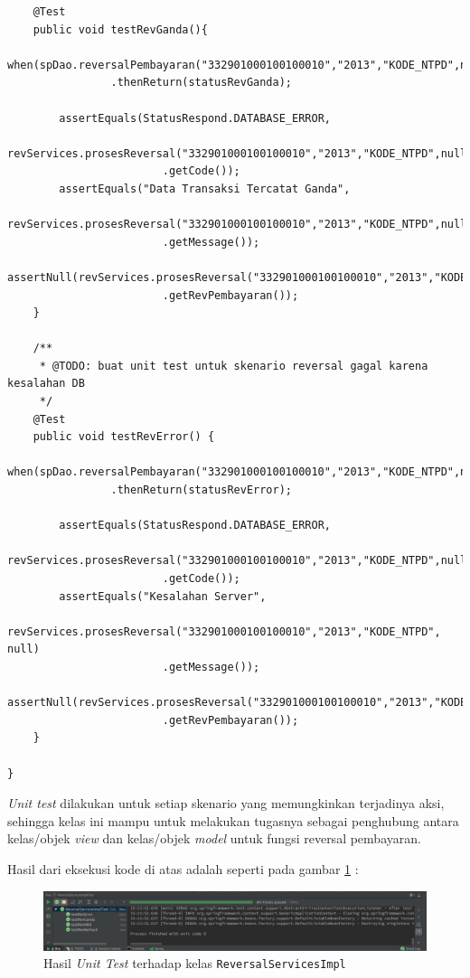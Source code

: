 \documentclass[pdftex,12pt, oneside]{article}
\begin{document}
\begin{enumerate}[A.]
\begin{enumerate}[1.]
\begin{lstlisting}
    @Test
    public void testRevGanda(){
        when(spDao.reversalPembayaran("332901000100100010","2013","KODE_NTPD",null))
                .thenReturn(statusRevGanda);

        assertEquals(StatusRespond.DATABASE_ERROR,
                revServices.prosesReversal("332901000100100010","2013","KODE_NTPD",null)
                        .getCode());
        assertEquals("Data Transaksi Tercatat Ganda",
                revServices.prosesReversal("332901000100100010","2013","KODE_NTPD",null)
                        .getMessage());
        assertNull(revServices.prosesReversal("332901000100100010","2013","KODE_NTPD",null)
                        .getRevPembayaran());
    }

    /**
     * @TODO: buat unit test untuk skenario reversal gagal karena kesalahan DB
     */
    @Test
    public void testRevError() {
        when(spDao.reversalPembayaran("332901000100100010","2013","KODE_NTPD",null))
                .thenReturn(statusRevError);

        assertEquals(StatusRespond.DATABASE_ERROR,
                revServices.prosesReversal("332901000100100010","2013","KODE_NTPD",null)
                        .getCode());
        assertEquals("Kesalahan Server",
                revServices.prosesReversal("332901000100100010","2013","KODE_NTPD", null)
                        .getMessage());
        assertNull(revServices.prosesReversal("332901000100100010","2013","KODE_NTPD",null)
                        .getRevPembayaran());
    }

}   
    \end{lstlisting}
    
    \textit{Unit test} dilakukan untuk setiap skenario yang memungkinkan terjadinya aksi, sehingga kelas ini mampu untuk melakukan tugasnya sebagai penghubung antara kelas/objek \textit{view} dan kelas/objek \textit{model} untuk fungsi reversal pembayaran.
    
    Hasil dari eksekusi kode di atas adalah seperti pada gambar \ref{fig:rev-service-ut} :
    
    \begin{figure}[H]
      \centering
      \includegraphics[width=1\textwidth]{./resources/04-rev-service-ut}
      \caption{Hasil \textit{Unit Test} terhadap kelas \texttt{ReversalServicesImpl}}
      \label{fig:rev-service-ut}
    \end{figure}
    

\end{enumerate}
\end{enumerate}
\end{document}
